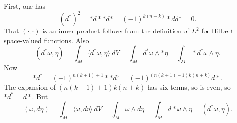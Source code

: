 \documentclass[10pt]{article}
\theoremstyle{definition}
\begin{document}
First, one has
$$(d^*)^2 = *d**d* = (-1)^{k(n-k)} *dd* = 0.$$
That $(\cdot, \cdot)$ is an inner product follows from the definition of $L^2$ for Hilbert space-valued functions.
Also
$$(d^*\omega, \eta) = \int_M \langle d^*\omega, \eta\rangle ~dV = \int_M d^*\omega \wedge *\eta = \int_M *d^*\omega \wedge \eta.$$
Now
$$*d^* = (-1)^{n(k+1)+1}**d* = (-1)^{(n(k+1)+1)k(n+k)} d*.$$
The expansion of $(n(k+1)+1)k(n+k)$ has six terms, so is even, so $*d^* = d*$. But
$$(\omega, d\eta) = \int_M \langle \omega, d\eta\rangle~dV = \int_M \omega \wedge d\eta = \int_M d*\omega \wedge \eta = (d^*\omega, \eta).$$
\end{document}

